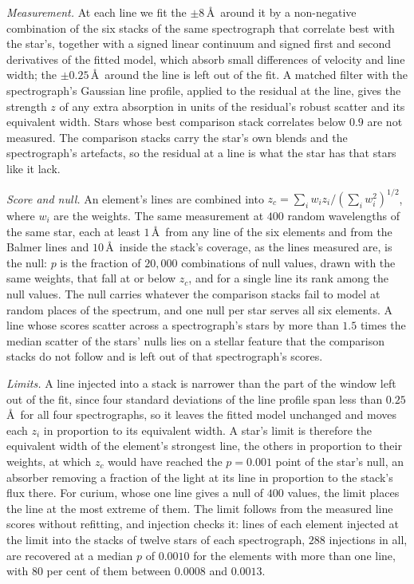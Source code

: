 \documentclass[3p,11pt]{elsarticle}
\begin{document}
\emph{Measurement.} At each line we fit the $\pm8$\,\AA\ around it by a non-negative
combination of the six stacks of the same spectrograph that correlate best with the
star's, together with a signed linear continuum and signed first and second derivatives
of the fitted model, which absorb small differences of velocity and line width; the
$\pm0.25$\,\AA\ around the line is left out of the fit. A matched filter with the
spectrograph's Gaussian line profile, applied to the residual at the line, gives the
strength $z$ of any extra absorption in units of the residual's robust scatter and its
equivalent width. Stars whose best comparison stack correlates below $0.9$ are not
measured. The comparison stacks carry the star's own blends and the spectrograph's
artefacts, so the residual at a line is what the star has that stars like it lack.

\emph{Score and null.} An element's lines are combined into
$z_c=\sum_i w_iz_i/(\sum_i w_i^2)^{1/2}$, where $w_i$ are the weights. The same
measurement at $400$ random wavelengths of the same star, each at least $1$\,\AA\ from
any line of the six elements and from the Balmer lines and $10$\,\AA\ inside the
stack's coverage, as the lines measured are, is the null: $p$ is the fraction of
$20{,}000$ combinations of null values, drawn with the same weights, that fall at or
below $z_c$, and for a single line its rank among the null values. The null carries
whatever the comparison stacks fail to model at random places of the spectrum, and one
null per star serves all six elements. A line whose scores scatter across a
spectrograph's stars by more than $1.5$ times the median scatter of the stars' nulls
lies on a stellar feature that the comparison stacks do not follow and is left out of
that spectrograph's scores.

\emph{Limits.} A line injected into a stack is narrower than the part of the window left
out of the fit, since four standard deviations of the line profile span less than
$0.25$\,\AA\ for all four spectrographs, so it leaves the fitted model unchanged and
moves each $z_i$ in proportion to its equivalent width. A star's limit is therefore the
equivalent width of the element's strongest line, the others in proportion to their
weights, at which $z_c$ would have reached the $p=0.001$ point of the star's null, an
absorber removing a fraction of the light at its line in proportion to the stack's flux
there. For curium, whose one line gives a null of $400$ values, the limit places the
line at the most extreme of them. The limit follows from the measured line scores
without refitting, and injection checks it: lines of each element injected at the limit
into the stacks of twelve stars of each spectrograph, $288$ injections in all, are
recovered at a median $p$ of $0.0010$ for the elements with more than one line, with
$80$ per cent of them between $0.0008$ and $0.0013$.
\end{document}
